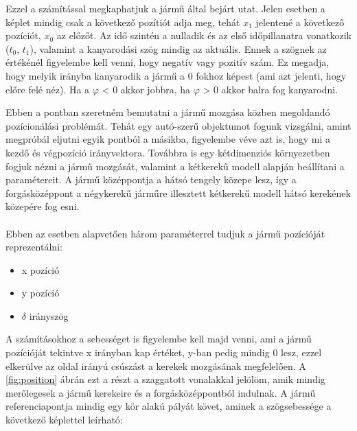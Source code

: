 Ezzel a számítással megkaphatjuk a jármű által bejárt utat. Jelen esetben a képlet mindig csak a következő pozítiót adja meg, tehát $x_1$ jelentené a következő pozíciót, $x_0$ az előzőt. Az idő szintén a nulladik és az első időpillanatra vonatkozik ($t_0$, $t_1$), valamint a kanyarodási szög mindig az aktuális. Ennek a szögnek az értékénél figyelembe kell venni, hogy negatív vagy pozitív szám. Ez megadja, hogy melyik irányba kanyarodik a jármű a 0 fokhoz képest (ami azt jelenti, hogy előre felé néz). Ha a $\varphi$ < 0 akkor jobbra, ha $\varphi$ > 0  akkor balra fog kanyarodni.


Ebben a pontban szeretném bemutatni a jármű mozgása közben megoldandó pozícionálási problémát. Tehát egy autó-szerű objektumot fogunk vizsgálni, amint megpróbál eljutni egyik pontból a másikba, figyelembe véve azt is, hogy mi a kezdő és végpozíció irányvektora. Továbbra is egy kétdimenziós környezetben fogjuk nézni a jármű mozgását, valamint a kétkerekű modell alapján beállítani a paramétereit. A jármű középpontja a hátsó tengely közepe lesz, így a forgásközéppont a négykerekű járműre illesztett kétkerekű modell hátsó kerekének közepére fog esni. \\\\
Ebben az esetben alapvetően három paraméterrel tudjuk a jármű pozícióját reprezentálni:
\begin{itemize}
	\item x pozíció
	\item y pozíció
	\item $ \delta $ irányszög
\end{itemize}
A számításokhoz a sebességet is figyelembe kell majd venni, ami a jármű pozícióját tekintve x irányban kap értéket, y-ban pedig mindig 0 lesz, ezzel elkerülve az oldal irányú csúszást a kerekek mozgásának megfelelően. A \ref{fig:position} ábrán ezt a részt a szaggatott vonalakkal jelölöm, amik mindig merőlegesek a jármű kerekeire és a forgásközéppontból indulnak. A jármű referenciapontja mindig egy kör alakú pályát követ, aminek a szögsebessége a következő képlettel leírható:\\

